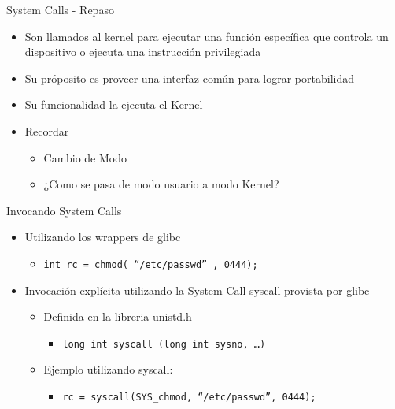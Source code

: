 \begin{frame}{System Calls - Repaso}
  \begin{itemize}
  \item Son llamados al kernel para ejecutar una función específica que controla un dispositivo o ejecuta una instrucción privilegiada 
  \item Su próposito es proveer una interfaz común para lograr portabilidad
  \item Su funcionalidad la ejecuta el Kernel   
  \item Recordar  
  \begin{itemize}
    \item Cambio de Modo
    \item ¿Como se pasa de modo usuario a modo Kernel?
  \end{itemize} 

  \end{itemize}
 
\end{frame}

\begin{frame}{Invocando System Calls}
  \begin{itemize}
  \item Utilizando los wrappers de glibc
         \begin{itemize}
            \item \texttt{int rc = chmod( ``/etc/passwd'' , 0444);}
         \end{itemize}
  \item Invocación explícita utilizando la System Call \alert{syscall} provista por glibc
         \begin{itemize}
            \item Definida en la libreria unistd.h
            \begin{itemize}
            \item \texttt{long int syscall (long int sysno, …) }
	    \end{itemize} 
	    \item Ejemplo utilizando syscall: 
              \begin{itemize}
                \item \texttt{rc = syscall(SYS\_chmod, ``/etc/passwd'', 0444);}
              \end{itemize}
         \end{itemize} 
  \end{itemize}
\end{frame}

